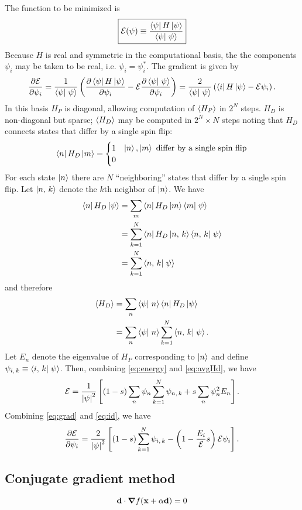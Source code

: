The function to be minimized is
\begin{equation}
  \boxed{
  \mathcal{E}(\psi) 
  \equiv \frac{\matrixel{\psi}{H}{\psi}}{\braket{\psi}{\psi}}
  }
  \label{eq:energy}
\end{equation}
Because $H$ is real and symmetric in the computational basis, the the
components $\psi_i$ may be taken to be real, i.e.
$\psi_i = \psi_i^*$.
The gradient is given by
\begin{equation}
  \pd{\mathcal{E}}{\psi_i}
  = \frac{1}{\braket{\psi}{\psi}}
  \left( \pd{\matrixel{\psi}{H}{\psi}}{\psi_i} - \mathcal{E} \pd{\braket{\psi}{\psi}}{\psi_i} \right)
  = \frac{2}{\braket{\psi}{\psi}}
  \left( \matrixel{i}{H}{\psi} - \mathcal{E} \psi_i \right).
  \label{eq:grad}
\end{equation}
In this basis $H_P$ is diagonal, allowing computation of $\left< H_P \right>$ in $2^N$
steps. $H_D$ is non-diagonal but sparse; $\left< H_D \right>$ may be computed in $2^N
\times N$ steps noting that $H_D$ connects states that differ by a single spin
flip:
\begin{equation}
  \matrixel{n}{H_D}{m}
  = \begin{cases}
    1 & \ket{n}, \ket{m} \text{ differ by a single spin flip} \\
    0
  \end{cases}
  \label{}
\end{equation}
For each state $\left| n \right>$ there are $N$ ``neighboring'' states that differ by a
single spin flip. Let $\left| n,\,k \right>$ denote the $k$th neighbor of
$\left| n \right>$. We have
\begin{align}
  \matrixel{n}{H_D}{\psi}
  &= \sum_m \matrixel{n}{H_D}{m} \braket{m}{\psi} \\
  &= \sum_{k=1}^N \matrixel{n}{H_D}{\nghbr{n}{k}} \braket{\nghbr{n}{k}}{\psi} \\
  &= \sum_{k=1}^N \braket{\nghbr{n}{k}}{\psi}
  \label{eq:id}
\end{align}
and therefore
\begin{align}
  \avg{H_D}
  &= \sum_n \braket{\psi}{n} \matrixel{n}{H_D}{\psi} \\
  &= \sum_n \braket{\psi}{n} \sum_{k=1}^{N} \braket{\nghbr{n}{k}}{\psi}.
  \label{eq:avgHd}
\end{align}
Let $E_n$ denote the eigenvalue of $H_P$ corresponding to $\left| n \right>$ and define
$\psi_{\nghbr{i}{k}} \equiv \braket{\nghbr{i}{k}}{\psi}$.
Then, combining \eqref{eq:energy} and \eqref{eq:avgHd}, we have
\begin{equation}
  \mathcal{E}
  = \frac{1}{\left| \psi \right|^2}
  \left[
  (1-s) \sum_n \psi_n \sum_{k=1}^N \psi_{n,\,k}
  + s \sum_n \psi_n^2 E_n
  \right].
  \label{}
\end{equation}
Combining \eqref{eq:grad} and \eqref{eq:id}, we have 
\begin{equation}
  \frac{\partial \mathcal{E}}{\partial \psi_i}
  = \frac{2}{\left| \psi \right|^2}
  \left[
      (1-s) \sum_{k=1}^N \psi_{i,\,k}
    - \left( 1 - \frac{E_i}{\mathcal{E}} s \right) \mathcal{E} \psi_i
  \right].
\end{equation}
\subsection{Conjugate gradient method}

\begin{equation}
  \mathbf{d} \cdot \mbox{\boldmath$ \nabla $} f(\mathbf{x} + \alpha \mathbf{d}) = 0
  \label{}
\end{equation}



